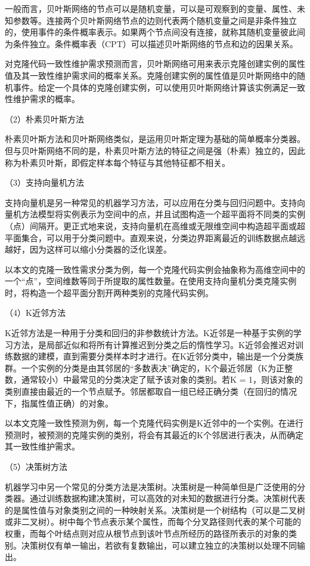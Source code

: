 一般而言，贝叶斯网络的节点可以是随机变量，可以是可观察到的变量、属性、未知参数等。连接两个贝叶斯网络节点的边则代表两个随机变量之间是非条件独立的，使用事件的条件概率表示。如果两个节点间没有连接，就称其随机变量彼此间为条件独立。条件概率表（CPT）可以描述贝叶斯网络的节点和边的因果关系。

对克隆代码一致性维护需求预测而言，贝叶斯网络可用来表示克隆创建实例的属性值及其一致性维护需求间的概率关系。克隆创建实例的属性值是贝叶斯网络中的随机事件。给定一个具体的克隆创建实例，可以使用贝叶斯网络计算该实例满足一致性维护需求的概率。

（2）朴素贝叶斯方法

朴素贝叶斯方法和贝叶斯网络类似，是运用贝叶斯定理为基础的简单概率分类器。但与贝叶斯网络不同的是，朴素贝叶斯方法的特征之间是强（朴素）独立的，因此称为朴素贝叶斯，即假定样本每个特征与其他特征都不相关。 

（3）支持向量机方法

支持向量机是另一种常见的机器学习方法，可以应用在分类与回归问题中。支持向量机方法模型将实例表示为空间中的点，并且试图构造一个超平面将不同类的实例（点）间隔开。更正式地来说，支持向量机在高维或无限维空间中构造超平面或超平面集合，可以用于分类问题中。直观来说，分类边界距离最近的训练数据点越远越好，因为这样可以缩小分类器的泛化误差。

以本文的克隆一致性需求分类为例，每一个克隆代码实例会抽象称为高维空间中的一个“点”，空间维数等同于所提取的属性数量。在使用支持向量机分类克隆实例时，将构造一个超平面分割开两种类别的克隆代码实例。

（4）K近邻方法

K近邻方法是一种用于分类和回归的非参数统计方法。K近邻是一种基于实例的学习方法，是局部近似和将所有计算推迟到分类之后的惰性学习。K近邻会推迟对训练数据的建模，直到需要分类样本时才进行。在K近邻分类中，输出是一个分类族群。一个实例的分类是由其邻居的“多数表决”确定的，K个最近邻居（K为正整数，通常较小）中最常见的分类决定了赋予该对象的类别。若K = 1，则该对象的类别直接由最近的一个节点赋予。邻居都取自一组已经正确分类（在回归的情况下，指属性值正确）的对象。

以本文克隆一致性预测为例，每一个克隆代码实例是K近邻中的一个实例。在进行预测时，被预测的克隆实例的类别，将会有其最近的K个邻居进行表决，从而确定其一致性维护需求。

（5）决策树方法

机器学习中另一个常见的分类方法是决策树。决策树是一种简单但是广泛使用的分类器。通过训练数据构建决策树，可以高效的对未知的数据进行分类。决策树代表的是属性值与对象类别之间的一种映射关系。决策树是一个树结构（可以是二叉树或非二叉树）。树中每个节点表示某个属性，而每个分叉路径则代表的某个可能的权重，而每个叶结点则对应从根节点到该叶节点所经历的路径所表示的对象的类别。决策树仅有单一输出，若欲有复数输出，可以建立独立的决策树以处理不同输出。


